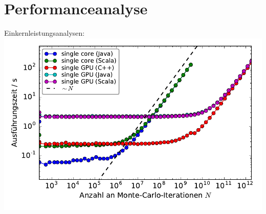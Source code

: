 \section{Performanceanalyse}


\begin{frame}
    Einkernleistungsanalysen: %
    \includegraphics[width=0.8\linewidth]{benchmarks-workload-scaling.pdf}

\end{frame}
